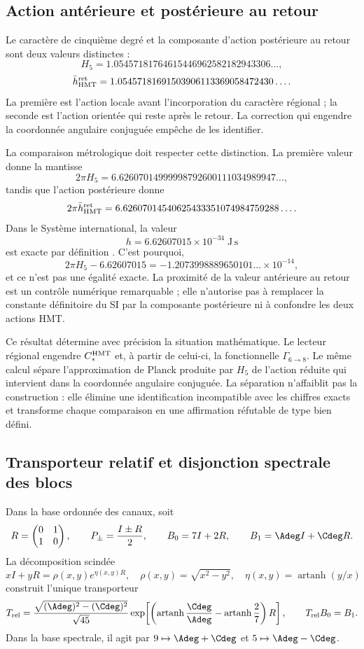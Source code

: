 \subsection{Action antérieure et postérieure au retour}

Le caractère de cinquième degré et la composante d'action postérieure au retour
sont deux valeurs distinctes :
\[
H_5
=1.05457181764615446962582182943306\ldots,
\]
\[
\bar h_{\rm HMT}^{\rm ret}
=1.05457181691503906113369058472430\ldots.
\]
La première est l'action locale avant l'incorporation du caractère régional ; la
seconde est l'action orientée qui reste après le retour. La correction
qui engendre la coordonnée angulaire conjuguée empêche de les identifier.

La comparaison métrologique doit respecter cette distinction. La première valeur donne
la mantisse
\[
2\pi H_5
=6.62607014999998792600111034989947\ldots,
\]
tandis que l'action postérieure donne
\[
2\pi\bar h_{\rm HMT}^{\rm ret}
=6.62607014540625433351074984759288\ldots.
\]
Dans le Système international, la valeur
\[
h=6.62607015\times10^{-34}\;\mathrm{J\,s}
\]
est exacte par définition \cite{BIPMSI}. C'est pourquoi,
\[
2\pi H_5-6.62607015
=-1.2073998889650101\ldots\times10^{-14},
\]
et ce n'est pas une égalité exacte. La proximité de la valeur antérieure au retour est
un contrôle numérique remarquable ; elle n'autorise pas à remplacer la constante définitoire
du SI par la composante postérieure ni à confondre les deux actions HMT\@.

Ce résultat détermine avec précision la situation mathématique. Le lecteur
régional engendre \(C_*^{\rm HMT}\) et, à partir de celui-ci, la fonctionnelle
\(\Gamma_{6\to8}\). Le même calcul sépare l'approximation de Planck
produite par \(H_5\) de l'action réduite qui intervient dans
la coordonnée angulaire conjuguée. La séparation n'affaiblit pas la construction : elle élimine une
identification incompatible avec les chiffres exacts et transforme chaque
comparaison en une affirmation réfutable de type bien défini.

\subsection{Transporteur relatif et disjonction spectrale des blocs}
\label{p12-83-c13-s3:sec:transportador-relativo-split}

Dans la base ordonnée des canaux, soit
\[
 R=\begin{pmatrix}0&1\\1&0\end{pmatrix},
 \qquad P_\pm=\frac{I\pm R}{2},
 \qquad
 B_0=7I+2R,
 \qquad B_1=\Adeg I+\Cdeg R.
\]
La décomposition scindée
\[
 xI+yR=\rho(x,y)e^{\eta(x,y)R},
 \quad \rho(x,y)=\sqrt{x^2-y^2},
 \quad \eta(x,y)=\operatorname{artanh}(y/x)
\]
construit l'unique transporteur
\[
 T_{\rm rel}
 =\frac{\sqrt{(\Adeg)^2-(\Cdeg)^2}}{\sqrt{45}}
   \exp\!\left[
   \left(\operatorname{artanh}\frac{\Cdeg}{\Adeg}
   -\operatorname{artanh}\frac27\right)R\right],
 \qquad T_{\rm rel}B_0=B_1.
\]
Dans la base spectrale, il agit par
\(9\mapsto\Adeg+\Cdeg\) et
\(5\mapsto\Adeg-\Cdeg\).

